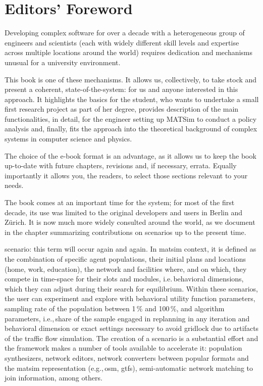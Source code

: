\chapter*{Editors' Foreword}


Developing complex software for over a decade with a heterogeneous group of engineers and scientists (each with widely different skill levels and expertise across multiple locations around the world) requires dedication and mechanisms unusual for a university environment. 

This book is one of these mechanisms. It allows us, collectively, to take stock and present a coherent, state-of-the-system: for us and anyone interested in this approach. It highlights the basics for the student, who wants to undertake a small first research project as part of her degree, provides description of the main functionalities, in detail, for the engineer setting up MATSim to conduct a policy analysis and, finally, fits the approach into the theoretical background of complex systems in computer science and physics. 

The choice of the e-book format is an advantage, as it allows us to keep the book up-to-date with future chapters, revisions and, if necessary, errata. Equally importantly it allows you, the readers, to select those sections relevant to your needs. 

The book comes at an important time for the system; for most of the first decade, its use was limited to the original developers and users in Berlin and Zürich. It is now much more widely consulted around the world, as we document in the chapter summarizing contributions on scenarios up to the present time. 

\Gls{scenario}: this term will occur again and again. In \gls{matsim} context, it is defined as the combination of specific agent populations, their initial plans and locations (home, work, education), the network and facilities where, and on which, they compete in time-space for their slots and modules, i.e.\,behavioral dimensions, which they can adjust during their search for equilibrium. Within these scenarios, the user can experiment and explore with behavioral utility function parameters, sampling rate of the population between 1\,\% and 100\,\%, and algorithm parameters, i.e.,\,share of the sample engaged in replanning in any iteration and behavioral dimension or exact settings necessary to avoid gridlock due to artifacts of the traffic flow simulation. The creation of a scenario is a substantial effort and the \gls{framework} makes a number of tools available to accelerate it: population synthesizers, network editors, network converters between popular formats and the \gls{matsim} representation (e.g.,\,\gls{osm}, \gls{gtfs}), semi-automatic network matching to join information, among others.


